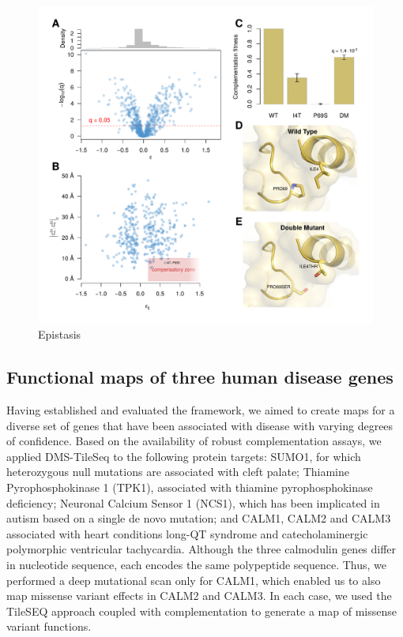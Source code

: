 \begin{figure}[h!]
	\centering
	\includegraphics[width=\textwidth]{img/epistasis.pdf}
	\caption{Epistasis}
	\label{fig:epsistasis}
\end{figure}


\subsection{Functional maps of three human disease genes}

Having established and evaluated the framework, we aimed to create maps for a diverse set of genes that have been associated with disease with varying degrees of confidence. Based on the availability of robust complementation assays, we applied DMS-TileSeq to the following protein targets: SUMO1, for which heterozygous null mutations are associated with cleft palate; Thiamine Pyrophosphokinase 1 (TPK1), associated with thiamine pyrophosphokinase deficiency; Neuronal Calcium Sensor 1 (NCS1), which has been implicated in autism based on a single de novo mutation;  and CALM1, CALM2 and CALM3 associated with heart conditions long-QT syndrome and catecholaminergic polymorphic ventricular tachycardia. Although the three calmodulin genes differ in nucleotide sequence, each encodes the same polypeptide sequence. Thus, we performed a deep mutational scan only for CALM1, which enabled us to also map missense variant effects in CALM2 and CALM3. In each case, we used the TileSEQ approach coupled with complementation to generate a map of missense variant functions. 

